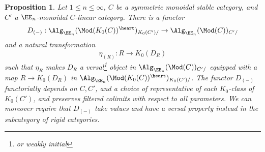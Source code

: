 \documentclass[12pt,oneside]{article}
\newcounter{counter}
\newtheorem{prop}[counter]{Proposition}
\begin{document}
	
	\begin{prop}\label{thm:versal}
		Let $1 \leq n\leq \infty$, $C$ be a symmetric monoidal stable category, and $C'$ a $\EE_n$-monoidal $C$-linear category. There is a functor $$D_{(-)}:\Alg_{\EE_n}(\Mod(K_0(C))^{\heart})_{K_0(C')/} \to \Alg_{\EE_n}(\Mod(C))_{C'/}$$ and a natural transformation
		$$\eta_{(R)}:R \to K_0(D_{R})$$
		such that $\eta_{R}$ makes $D_{R}$ a versal\footnote{or weakly initial} object in $\Alg_{\EE_n}(\Mod(C))_{C'/}$ equipped with a map  $R \to K_0(D_{R})$ in $\Alg_{\EE_n}(\Mod(K_0(C))^{\heart})_{K_0(C')/}$. The functor $D_{(-)}$ functorially depends on $C,C'$, and a choice of representative of each $K_0$-class of $K_0(C')$, and preserves filtered colimits with respect to all parameters. We can moreover require that $D_{(-)}$ take values and have a versal property instead in the subcategory of rigid categories.
%		
	\end{prop}
\end{document}
